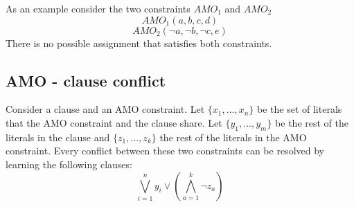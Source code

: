 As an example consider the two constraints $AMO_1$ and $AMO_2$
\begin{displaymath}
AMO_1(a,b,c,d)
\end{displaymath}
\begin{displaymath}
AMO_2(\neg a, \neg b, \neg c, e)
\end{displaymath}
There is no possible assignment that satisfies both constraints.

\subsection{AMO - clause conflict}

\begin{leftbar}
Consider a clause and an AMO constraint. Let $\{x_1,...,x_n\}$ be the set of literals that the AMO constraint and the clause share. Let $\{y_1,...,y_m\}$ be the rest of the literals in the clause and $\{z_1,...,z_k\}$ the rest of the literals in the AMO constraint.
Every conflict between these two constraints can be resolved by learning the following clauses:
\begin{displaymath}
\bigvee_{i=1}^{n}y_i \vee (\bigwedge_{a=1}^{k}\neg z_a)
\end{displaymath}

\end{leftbar}

